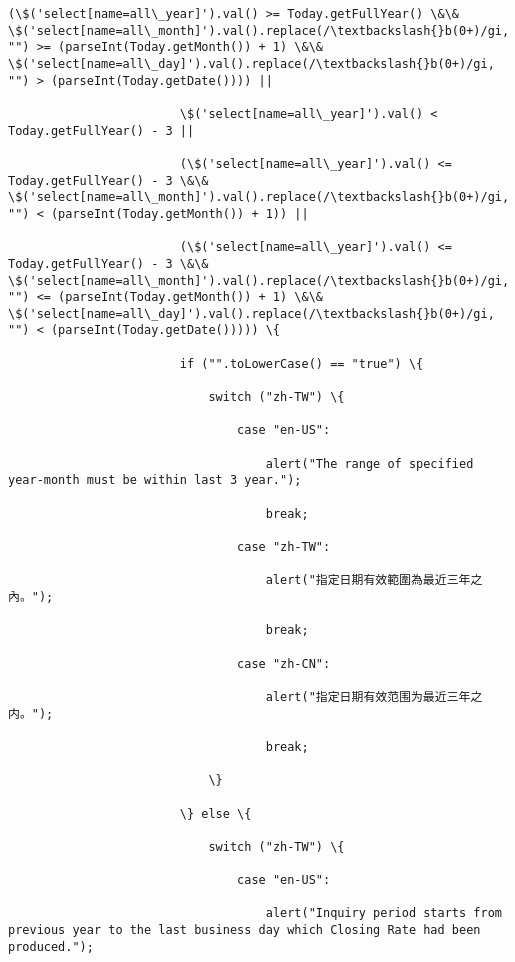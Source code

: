 \documentclass[11pt]{article}
\begin{document}
\begin{Verbatim}[commandchars=\\\{\}]
                        (\$('select[name=all\_year]').val() >= Today.getFullYear() \&\& \$('select[name=all\_month]').val().replace(/\textbackslash{}b(0+)/gi, "") >= (parseInt(Today.getMonth()) + 1) \&\& \$('select[name=all\_day]').val().replace(/\textbackslash{}b(0+)/gi, "") > (parseInt(Today.getDate()))) ||

                        \$('select[name=all\_year]').val() < Today.getFullYear() - 3 ||

                        (\$('select[name=all\_year]').val() <= Today.getFullYear() - 3 \&\& \$('select[name=all\_month]').val().replace(/\textbackslash{}b(0+)/gi, "") < (parseInt(Today.getMonth()) + 1)) ||

                        (\$('select[name=all\_year]').val() <= Today.getFullYear() - 3 \&\& \$('select[name=all\_month]').val().replace(/\textbackslash{}b(0+)/gi, "") <= (parseInt(Today.getMonth()) + 1) \&\& \$('select[name=all\_day]').val().replace(/\textbackslash{}b(0+)/gi, "") < (parseInt(Today.getDate())))) \{

                        if ("".toLowerCase() == "true") \{

                            switch ("zh-TW") \{

                                case "en-US":

                                    alert("The range of specified year-month must be within last 3 year.");

                                    break;

                                case "zh-TW":

                                    alert("指定日期有效範圍為最近三年之內。");

                                    break;

                                case "zh-CN":

                                    alert("指定日期有效范围为最近三年之内。");

                                    break;

                            \}

                        \} else \{

                            switch ("zh-TW") \{

                                case "en-US":

                                    alert("Inquiry period starts from previous year to the last business day which Closing Rate had been produced.");


\end{Verbatim}
\end{document}
